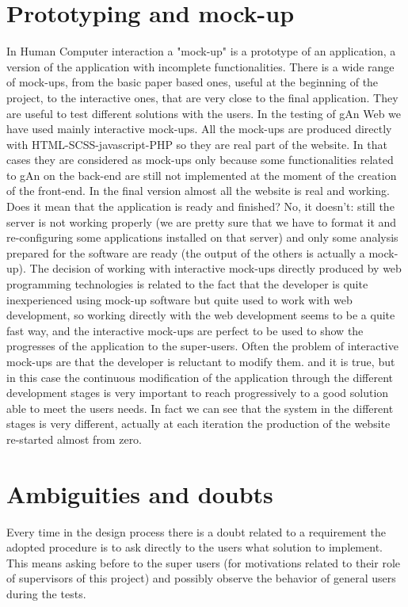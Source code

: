 \section{Prototyping and mock-up}
In Human Computer interaction a "mock-up" is a prototype of an application, a version of the application with incomplete functionalities. There is a wide range of mock-ups, from the basic paper based ones, useful at the beginning of the project, to the interactive ones, that are very close to the final application. They are useful to test different solutions with the users.
In the testing of gAn Web we have used mainly interactive mock-ups. All the mock-ups are produced directly with HTML-SCSS-javascript-PHP so they are real part of the website. In that cases they are considered as mock-ups only because some functionalities related to gAn on the back-end are still not implemented at the moment of the creation of the front-end. In the final version almost all the website is real and working. Does it mean that the application is ready and finished? No, it doesn't: still the server is not working properly (we are pretty sure that we have to format it and re-configuring some applications installed on that server) and only some analysis prepared for the software are ready (the output of the others is actually a mock-up). The decision of working with interactive mock-ups directly produced by web programming technologies is related to the fact that the developer is quite inexperienced using mock-up software but quite used to work with web development, so working directly with the web development seems to be a quite fast way, and the interactive mock-ups are perfect to be used to show the progresses of the application to the super-users.
Often the problem of interactive mock-ups are that the developer is reluctant to modify them. and it is true, but in this case the continuous modification of the application through the different development stages is very important to reach progressively to a good solution able to meet the users needs. In fact we can see that the system in the different stages is very different, actually at each iteration the production of the website re-started almost from zero. 

\section{Ambiguities and doubts}
Every time in the design process there is a doubt related to a requirement the adopted procedure is to ask directly to the users what solution to implement. This means asking before to the super users (for motivations related to their role of supervisors of this project) and possibly observe the behavior of general 
users during the tests.

